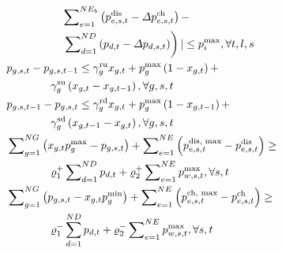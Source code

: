 \documentclass[lettersize,journal]{IEEEtran}
\newenvironment{newsubequations}{\small\begin{subequations}}{\end{subequations}}
\begin{document}
\begin{newsubequations}
\begin{align}
		 & \qquad \qquad \quad\sum\nolimits_{e = 1}^{NE_b} \left(p_{e,s,t}^{\text{dis}} - \varDelta p_{e,s,t}^{\text{ch}}\right) -  \notag                                                                                             \\
		 & \qquad \qquad \quad \left.\sum\nolimits_{d=1}^{ND}\left(p_{d,t} - \varDelta p_{d,s,t}\right) \right) \vert \leq p_{i}^{\text{max}}, \forall t, l, s \notag                                                                  \\
		 & p_{g,s,t} - p_{g,s,t -1} \leq \gamma_{g}^{\text{ru}} x_{g,t} + p_{g}^{\text{max}}\left(1 - x_{g,t}\right) + \notag                                                                                                          \\
		 & \qquad \qquad \gamma_{g}^{\text{su}}\left(x_{g,t} - x_{g, t-1}\right), \forall g, s, t \label{20-h}                                                                                                                         \\
		 & p_{g,s,t-1} - p_{g,s,t} \leq \gamma_{g}^{\text{rd}} x_{g,t} + p_{g}^{\text{max}}\left(1 - x_{g,t-1}\right) + \notag                                                                                                         \\
		 & \qquad \qquad \gamma_{g}^{\text{sd}}\left(x_{g,t-1} - x_{g, t}\right), \forall g, s, t \label{20-i}                                                                                                                         \\
		 & \sum\nolimits_{g=1}^{NG}\left( x_{g,t} p_{g}^{\text{max}} - p_{g,s,t}\right) + \sum\nolimits_{e=1}^{NE}\left(p_{e,s,t}^{\text{dis, max}} - p_{e,s,t}^{\text{dis}}\right) \geq \notag                                        \\
		 & \qquad \qquad \varrho_{1}^{+} \sum\nolimits_{d=1}^{ND} p_{d,t} + \varrho_{2}^{+}\sum\nolimits_{e=1}^{NE} p_{w,s,t}^{\text{max}}, \forall s, t \label{20-j}                                                                  \\
		 & \sum\nolimits_{g=1}^{NG}\left( p_{g,s,t} - x_{g,t} p_{g}^{\text{min}}\right) + \sum\nolimits_{e=1}^{NE}\left(p_{e,s,t}^{\text{ch, max}} - p_{e,s,t}^{\text{ch}}\right) \geq \notag                                          \\
		 & \qquad \qquad \varrho_{1}^{-} \sum_{d=1}^{ND} p_{d,t} + \varrho_{2}^{-}\sum\nolimits_{e=1}^{NE} p_{w,s,t}^{\text{max}}, \forall s, t \label{20-k}                                                                           \\

\end{align}
\end{newsubequations}
\end{document}
